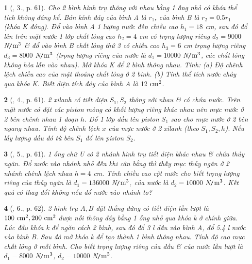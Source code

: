 \documentclass{article}
\newtheorem{baitoan}{}
\begin{document}
\begin{baitoan}[\cite{Van_Quyen_Hanh_Nhu_10_chuyen_Ly}, 3., p. 61]
	Cho 2 bình hình trụ thông với nhau bằng 1 ống nhỏ có khóa thể tích không đáng kể. Bán kính đáy của bình A là $r_1$, của bình B là $r_2 = 0.5r_1$ (khóa K đóng). Đổ vào bình A 1 lượng nước đến chiều cao $h_1 = 18$ {\rm cm}, sau đó đổ lên trên mặt nước 1 lớp chất lỏng cao $h_2 = 4$ {\rm cm} có trọng lượng riêng $d_2 = 9000$ {\rm N{\tt/}$\rm m^3$} \& đổ vào bình B chất lỏng thứ 3 có chiều cao $h_3 = 6$ {\rm cm} trọng lượng riêng $d_3 = 8000$ {\rm N{\tt/}$\rm m^3$} (trọng lượng riêng của nước là $d_1 = 10000$ {\rm N{\tt/}$\rm m^3$}, các chất lỏng không hòa lẫn vào nhau). Mở khóa K để 2 bình thông nhau. Tính: (a) Độ chênh lệch chiều cao của mặt thoáng chất lỏng ở 2 bình. (b) Tính thể tích nước chảy qua khóa K. Biết diện tích đáy của bình A là $\rm12\ cm^2$.
\end{baitoan}

\begin{baitoan}[\cite{Van_Quyen_Hanh_Nhu_10_chuyen_Ly}, 4., p. 61]
	2 xilanh có tiết diện $S_1,S_2$ thông với nhau \& có chứa nước. Trên mặt nước có đặt các piston mỏng có khối lượng riêng khác nhau nên mực nước ở 2 bên chênh nhau 1 đoạn $h$. Đổ 1 lớp dầu lên piston $S_1$ sao cho mực nước ở 2 bên ngang nhau. Tính độ chênh lệch $x$ của mực nước ở 2 xilanh (theo $S_1,S_2,h$). Nếu lấy lượng dầu đó từ bên $S_1$ đổ lên piston $S_2$.
\end{baitoan}

\begin{baitoan}[\cite{Van_Quyen_Hanh_Nhu_10_chuyen_Ly}, 5., p. 61]
	1 ống chữ U có 2 nhánh hình trụ tiết diện khác nhau \& chứa thủy ngân. Đổ nước vào nhánh nhỏ đến khi cân bằng thì thấy mực thủy ngân ở 2 nhánh chênh lệch nhau $h = 4$ {\rm cm}. Tính chiều cao cột nước cho biết trọng lượng riêng của thủy ngân là $d_1 = 136000$ {\rm N{\tt/}$\rm m^3$}, của nước là $d_2 = 10000$ {\rm N{\tt/}$\rm m^3$}. Kết quả có thay đổi không nếu đổ nước vào nhánh to?
\end{baitoan}

\begin{baitoan}[\cite{Van_Quyen_Hanh_Nhu_10_chuyen_Ly}, 6., p. 62]
	2 hình trụ $A,B$ đặt thẳng đứng có tiết diện lần lượt là $\rm100\ cm^2,200\ cm^2$ được nối thông đáy bằng 1 ống nhỏ qua khóa k ở chính giữa. Lúc đầu khóa k để ngăn cách 2 bình, sau đó đổ {\rm3 l} dầu vào bình A, đổ {\rm5.4 l} nước vào bình B. Sau đó mở khóa k để tạo thành 1 bình thông nhau. Tính độ cao mực chất lỏng ở mỗi bình. Cho biết trọng lượng riêng của dầu \& của nước lần lượt là $d_1 = 8000$ {\rm N{\tt/}$\rm m^3$}, $d_2 = 10000$ {\rm N{\tt/}$\rm m^3$}.
\end{baitoan}
\end{document}
